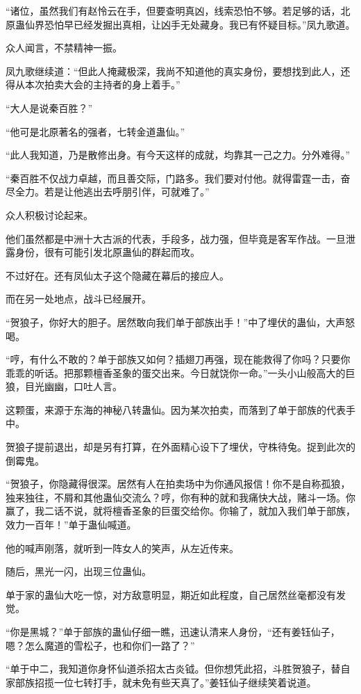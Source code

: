 \begin{this_body}
“诸位，虽然我们有赵怜云在手，但要查明真凶，线索恐怕不够。若足够的话，北原蛊仙界恐怕早已经发掘出真相，让凶手无处藏身。我已有怀疑目标。”凤九歌道。

众人闻言，不禁精神一振。

凤九歌继续道：“但此人掩藏极深，我尚不知道他的真实身份，要想找到此人，还得从本次拍卖大会的主持者的身上着手。”

“大人是说秦百胜？”

“他可是北原著名的强者，七转金道蛊仙。”

“此人我知道，乃是散修出身。有今天这样的成就，均靠其一己之力。分外难得。”

“秦百胜不仅战力卓越，而且善交际，门路多。我们要对付他。就得雷霆一击，奋尽全力。若是让他逃出去呼朋引伴，可就难了。”

众人积极讨论起来。

他们虽然都是中洲十大古派的代表，手段多，战力强，但毕竟是客军作战。一旦泄露身份，很有可能引发北原蛊仙的群起而攻。

不过好在。还有凤仙太子这个隐藏在幕后的接应人。

而在另一处地点，战斗已经展开。

“贺狼子，你好大的胆子。居然敢向我们单于部族出手！”中了埋伏的蛊仙，大声怒喝。

“哼，有什么不敢的？单于部族又如何？插翅刀再强，现在能救得了你吗？只要你乖乖的听话。把那颗檀香圣象的蛋交出来。今日就饶你一命。”一头小山般高大的巨狼，目光幽幽，口吐人言。

这颗蛋，来源于东海的神秘八转蛊仙。因为某次拍卖，而落到了单于部族的代表手中。

贺狼子提前退出，却是另有打算，在外面精心设下了埋伏，守株待兔。捉到此次的倒霉鬼。

“贺狼子，你隐藏得很深。居然有人在拍卖场中为你通风报信！你不是自称孤狼，独来独往，不屑和其他蛊仙交流么？哼，你有种的就和我痛快大战，赌斗一场。你赢了，我二话不说，就将檀香圣象的巨蛋交给你。你输了，就加入我们单于部族，效力一百年！”单于蛊仙喊道。

他的喊声刚落，就听到一阵女人的笑声，从左近传来。

随后，黑光一闪，出现三位蛊仙。

单于家的蛊仙大吃一惊，对方敌意明显，期近如此程度，自己居然丝毫都没有发觉。

“你是黑城？”单于部族的蛊仙仔细一瞧，迅速认清来人身份，“还有姜钰仙子，嗯？怎么魔道的雪松子，也和你们一路了？”

“单于中二，我知道你身怀仙道杀招太古炎钺。但你想凭此招，斗胜贺狼子，替自家部族招揽一位七转打手，就未免有些天真了。”姜钰仙子继续笑着说道。


\end{this_body}
